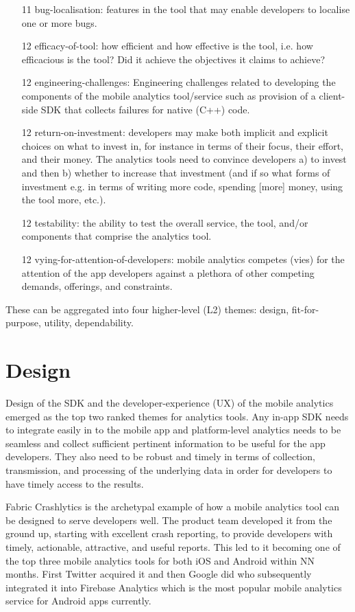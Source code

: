 {\begin{enumerate}
    \item[11] bug-localisation: features in the tool that may enable developers to localise one or more bugs.
    \item[12] efficacy-of-tool: how efficient and how effective is the tool, i.e. how efficacious is the tool? Did it achieve the objectives it claims to achieve?
    \item[12] engineering-challenges: Engineering challenges related to developing the components of the mobile analytics tool/service such as provision of a client-side SDK that collects failures for native (C++) code.
    \item[12] return-on-investment: developers may make both implicit and explicit choices on what to invest in, for instance in terms of their focus, their effort, and their money. The analytics tools need to convince developers a) to invest and then b) whether to increase that investment (and if so what forms of investment e.g. in terms of writing more code, spending [more] money, using the tool more, etc.).
    \item[12] testability: the ability to test the overall service, the tool, and/or components that comprise the analytics tool.
    \item[12] vying-for-attention-of-developers: mobile analytics competes (vies) for the attention of the app developers against a plethora of other competing demands, offerings, and constraints. 
\end{enumerate}
}

These can be aggregated into four higher-level (L2) themes: design, fit-for-purpose, utility, dependability.

\section{Design}
Design of the SDK and the developer-experience (UX) of the mobile analytics emerged as the top two ranked themes for analytics tools. Any in-app SDK needs to integrate easily in to the mobile app and platform-level analytics needs to be seamless and collect sufficient pertinent information to be useful for the app developers. They also need to be robust and timely in terms of collection, transmission, and processing of the underlying data in order for developers to have timely access to the results. 

Fabric Crashlytics is the archetypal example of how a mobile analytics tool can be designed to serve developers well. The product team developed it from the ground up, starting with excellent crash reporting, to provide developers with timely, actionable, attractive, and useful reports. This led to it becoming one of the top three mobile analytics tools for both iOS and Android within NN months. First Twitter acquired it and then Google did who subsequently integrated it into Firebase Analytics which is the most popular mobile analytics service for Android apps currently.

